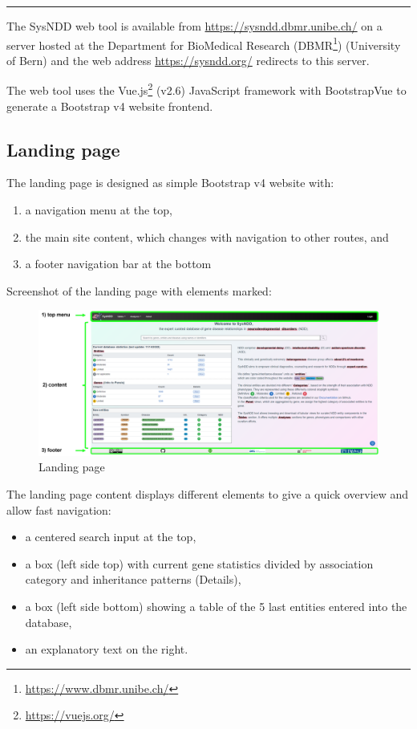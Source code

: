 \documentclass[
]{article}
\providecommand{\tightlist}{%
  \setlength{\itemsep}{0pt}\setlength{\parskip}{0pt}}
\renewcommand{\href}[2]{#2\footnote{\url{#1}}}
\begin{document}
\begin{center}\rule{0.5\linewidth}{0.5pt}\end{center}

The SysNDD web tool is available from \url{https://sysndd.dbmr.unibe.ch/} on a server hosted at the Department for BioMedical Research (\href{https://www.dbmr.unibe.ch/}{DBMR}) (University of Bern) and the web address \url{https://sysndd.org/} redirects to this server.

The web tool uses the \href{https://vuejs.org/}{Vue.js} (v2.6) JavaScript framework with BootstrapVue to generate a Bootstrap v4 website frontend.

\hypertarget{landing-page}{%
\subsection{Landing page}\label{landing-page}}

The landing page is designed as simple Bootstrap v4 website with:

\begin{enumerate}
\def\labelenumi{\arabic{enumi})}
\tightlist
\item
  a navigation menu at the top,
\item
  the main site content, which changes with navigation to other routes, and
\item
  a footer navigation bar at the bottom
\end{enumerate}

Screenshot of the landing page with elements marked:

\begin{figure}
\centering
\includegraphics{./static/img/02_01-landing-page.png}
\caption{Landing page}
\end{figure}

The landing page content displays different elements to give a quick overview and allow fast navigation:

\begin{itemize}
\tightlist
\item
  a centered search input at the top,
\item
  a box (left side top) with current gene statistics divided by association category and inheritance patterns (Details),
\item
  a box (left side bottom) showing a table of the 5 last entities entered into the database,
\item
  an explanatory text on the right.
\end{itemize}
\end{document}

